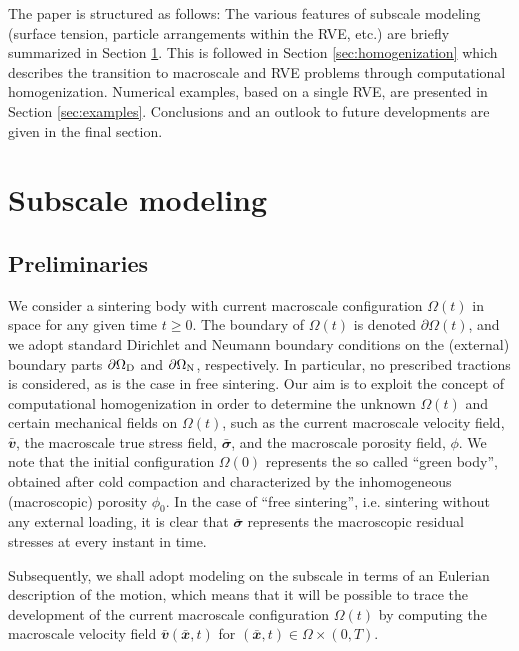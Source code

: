 \documentclass[12pt,a4paper,fleqn]{article}
\renewcommand{\ta}[1]{\mathbfit{#1}}
\renewcommand{\ts}[1]{\mathbfit{#1}}
\newcommand{\figref}[1]{Figure~\ref{#1}}
\newcommand{\pore}{\mathrm{pore}}
\newcommand{\particle}{\mathrm{part}}
\newcommand{\contact}{\mathrm{cont}}
\begin{document}
The paper is structured as follows:
The various features of subscale modeling (surface tension, particle arrangements within the RVE, etc.) are briefly summarized in Section \ref{sec:subscale}.
This is followed in Section \ref{sec:homogenization} which describes the transition to macroscale and RVE problems through computational homogenization.
Numerical examples, based on a single RVE, are presented in Section \ref{sec:examples}. Conclusions and an outlook to future developments are given in the final section.


\section{Subscale modeling}\label{sec:subscale}

\subsection{Preliminaries}

We consider a sintering body with current macroscale configuration $\Omega(t)$ in space for any given time $t\geq 0$. The boundary of $\Omega(t)$ is denoted $\partial\Omega(t)$, and we adopt standard Dirichlet and Neumann boundary conditions on the (external) boundary parts $\partial\Omega_{\mathrm{D}}$ and $\partial\Omega_{\mathrm{N}}$, respectively.
In particular, no prescribed tractions is considered, as is the case in free sintering.
Our aim is to exploit the concept of computational homogenization in order to determine the unknown $\Omega(t)$ and certain mechanical fields on $\Omega(t)$, such as the current macroscale velocity field, $\bar{\ts v}$, the macroscale true stress field, $\bar{\ts\sigma}$, and the macroscale porosity field, $\phi$.
We note that the initial configuration $\Omega(0)$ represents the so called ``green body'', obtained after cold compaction and characterized by the inhomogeneous (macroscopic) porosity $\phi_0$.
In the case of ``free sintering'', i.e. sintering without any external loading, it is clear that $\bar{\ts\sigma}$ represents the macroscopic residual stresses at every instant in time.

Subsequently, we shall adopt modeling on the subscale in terms of an Eulerian description of the motion, which means that it will be possible to trace the development of the current macroscale configuration $\Omega(t)$ by computing the macroscale velocity field $\bar{\ta v}(\bar{\ta x},t)$ for $(\bar{\ta x},t)\in\Omega\times(0,T)$.
\end{document}
